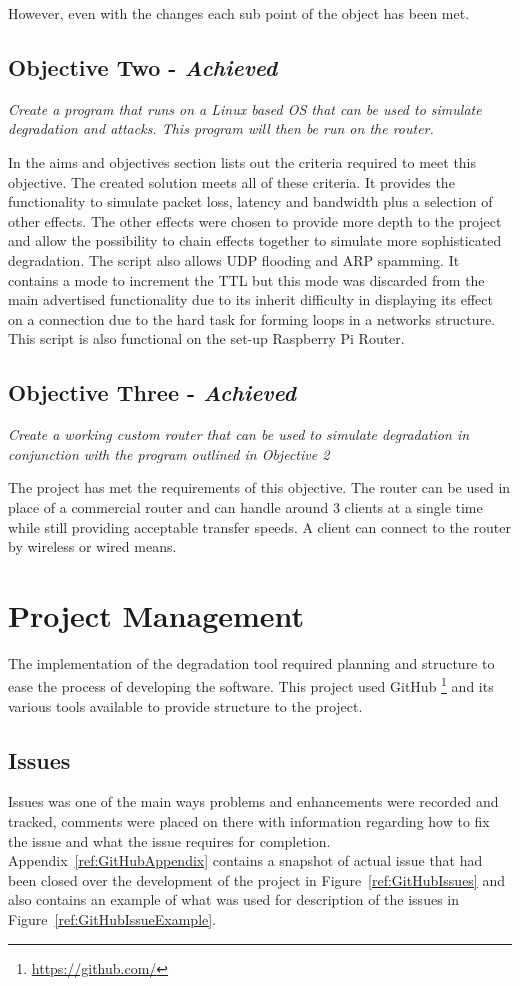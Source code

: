 However, even with the changes each sub point of the object has been met.

\subsection{Objective Two - {\it Achieved}}
{\it Create a program that runs on a Linux based OS that can be used to simulate degradation and attacks. This program will then be run on the router.}

In the aims and objectives section lists out the criteria required to meet this objective. The created solution meets all of these criteria. It provides the functionality to simulate packet loss, latency and bandwidth plus a selection of other effects. The other effects were chosen to provide more depth to the project and allow the possibility to chain effects together to simulate more sophisticated degradation. The script also allows UDP flooding and ARP spamming. It contains a mode to increment the TTL but this mode was discarded from the main advertised functionality due to its inherit difficulty in displaying its effect on a connection due to the hard task for forming loops in a networks structure. This script is also functional on the set-up Raspberry Pi Router.


\subsection{Objective Three - {\it Achieved}}
{\it Create a working custom router that can be used to simulate degradation in conjunction with the program outlined in Objective 2}

The project has met the requirements of this objective. The router can be used in place of a commercial router and can handle around 3 clients at a single time while still providing acceptable transfer speeds. A client can connect to the router by wireless or wired means.

\section{Project Management}
The implementation of the degradation tool required planning and structure to ease the process of developing the software. This project used GitHub \footnote{\url{https://github.com/}} and its various tools available to provide structure to the project.

\subsection{Issues}
Issues was one of the main ways problems and enhancements were recorded and tracked, comments were placed on there with information regarding how to fix the issue and what the issue requires for completion. Appendix~\ref{ref:GitHubAppendix} contains a snapshot of actual issue that had been closed over the development of the project in Figure~\ref{ref:GitHubIssues} and also contains an example of what was used for description of the issues in Figure~\ref{ref:GitHubIssueExample}.

